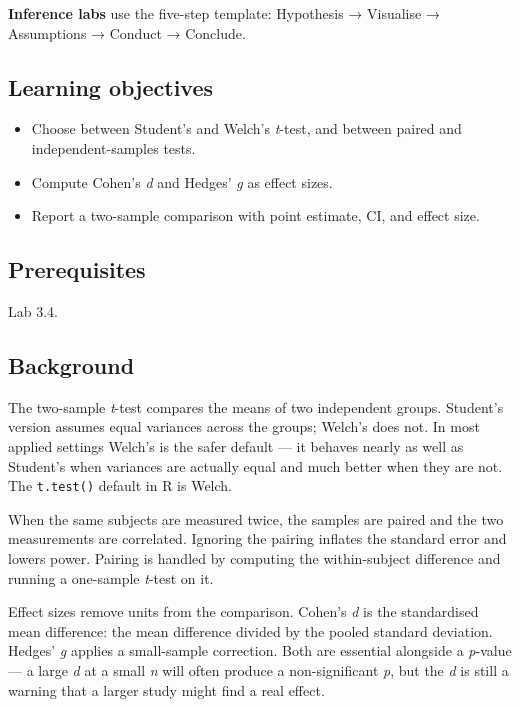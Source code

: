 \documentclass[
]{article}
\author{}
\date{\vspace{-2.5em}}
\providecommand{\tightlist}{%
  \setlength{\itemsep}{0pt}\setlength{\parskip}{0pt}}
\begin{document}
\textbf{Inference labs} use the five-step template: Hypothesis →
Visualise → Assumptions → Conduct → Conclude.

\subsection{Learning objectives}\label{learning-objectives}

\begin{itemize}
\tightlist
\item
  Choose between Student's and Welch's \emph{t}-test, and between paired
  and independent-samples tests.
\item
  Compute Cohen's \emph{d} and Hedges' \emph{g} as effect sizes.
\item
  Report a two-sample comparison with point estimate, CI, and effect
  size.
\end{itemize}

\subsection{Prerequisites}\label{prerequisites}

Lab 3.4.

\subsection{Background}\label{background}

The two-sample \emph{t}-test compares the means of two independent
groups. Student's version assumes equal variances across the groups;
Welch's does not. In most applied settings Welch's is the safer default
--- it behaves nearly as well as Student's when variances are actually
equal and much better when they are not. The \texttt{t.test()} default
in R is Welch.

When the same subjects are measured twice, the samples are paired and
the two measurements are correlated. Ignoring the pairing inflates the
standard error and lowers power. Pairing is handled by computing the
within-subject difference and running a one-sample \emph{t}-test on it.

Effect sizes remove units from the comparison. Cohen's \emph{d} is the
standardised mean difference: the mean difference divided by the pooled
standard deviation. Hedges' \emph{g} applies a small-sample correction.
Both are essential alongside a \emph{p}-value --- a large \emph{d} at a
small \emph{n} will often produce a non-significant \emph{p}, but the
\emph{d} is still a warning that a larger study might find a real
effect.
\end{document}
